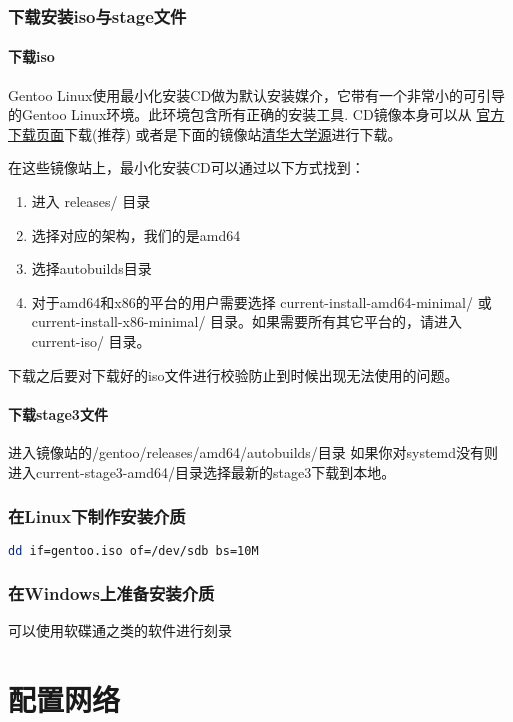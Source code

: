 \documentclass{book}
\begin{document}
\subsection{下载安装iso与stage文件}
\subsubsection{下载iso}
Gentoo Linux使用最小化安装CD做为默认安装媒介，它带有一个非常小的可引导的Gentoo Linux环境。此环境包含所有正确的安装工具. CD镜像本身可以从
\href{http://distfiles.gentoo.org/releases/amd64/autobuilds/}{官方下载页面}下载(推荐) 或者是下面的镜像站\href{https://mirror.tuna.tsinghua.edu.cn/gentoo/releases/amd64/autobuilds/}{清华大学源}进行下载。

在这些镜像站上，最小化安装CD可以通过以下方式找到：
\begin{enumerate}
\item 进入 releases/ 目录
\item 选择对应的架构，我们的是amd64
\item 选择autobuilds目录
\item 对于amd64和x86的平台的用户需要选择 current-install-amd64-minimal/ 或 current-install-x86-minimal/ 目录。如果需要所有其它平台的，请进入 current-iso/ 目录。
\end{enumerate}

下载之后要对下载好的iso文件进行校验防止到时候出现无法使用的问题。


\subsubsection{下载stage3文件}
进入镜像站的/gentoo/releases/amd64/autobuilds/目录
如果你对systemd没有则进入current-stage3-amd64/目录选择最新的stage3下载到本地。


\subsection{在Linux下制作安装介质}

\begin{lstlisting}[language=Bash]
  dd if=gentoo.iso of=/dev/sdb bs=10M
\end{lstlisting}
\subsection{在Windows上准备安装介质}
可以使用软碟通之类的软件进行刻录

\chapter{配置网络}
\end{document}
